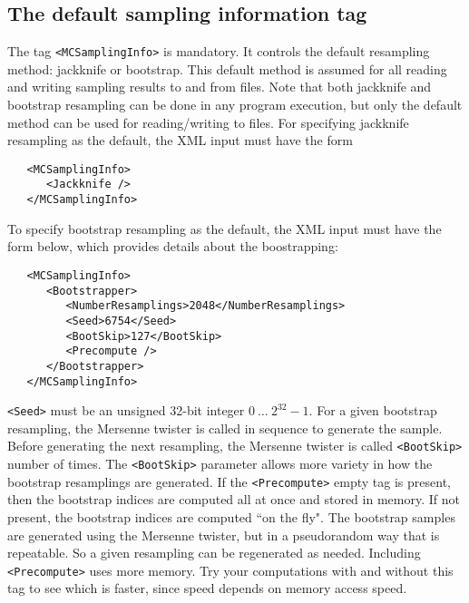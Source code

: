 \documentclass[12pt]{article}
\newcommand{\vb}{\texttt}
\begin{document}
\subsection{The default sampling information tag}
The tag \vb{<MCSamplingInfo>} is mandatory.  It controls the default
resampling method:  jackknife or bootstrap.  This default method    
is assumed for all reading and writing sampling results to and      
from files.  Note that both jackknife and bootstrap resampling      
can be done in any program execution, but only the default method can be used      
for reading/writing to files.  For specifying jackknife resampling as
the default, the XML input must have the form
\begin{verbatim}
   <MCSamplingInfo>
      <Jackknife />
   </MCSamplingInfo>
\end{verbatim}
To specify bootstrap resampling as the default, the XML input must have the
form below, which provides details about the boostrapping:
\begin{verbatim}
   <MCSamplingInfo> 
      <Bootstrapper>
         <NumberResamplings>2048</NumberResamplings>
         <Seed>6754</Seed> 
         <BootSkip>127</BootSkip>
         <Precompute /> 
      </Bootstrapper>
   </MCSamplingInfo> 
\end{verbatim}
\vb{<Seed>} must be an unsigned 32-bit integer $0\ \dots\ 2^{32}-1$.
For a given bootstrap resampling, the Mersenne twister is
called in sequence to generate the sample. Before generating
the next resampling, the Mersenne twister is called \vb{<BootSkip>}
number of times. The \vb{<BootSkip>} parameter allows more variety
in how the bootstrap resamplings are generated. If the \vb{<Precompute>} 
empty tag is present, then the bootstrap indices are computed all at once 
and stored in memory. If not present, the bootstrap indices are computed 
``on the fly". The bootstrap samples are generated using the Mersenne
twister, but in a pseudorandom way that is repeatable. So a given resampling 
can be regenerated as needed. Including \vb{<Precompute>} uses more memory.
Try your computations with and without this tag to see which is faster, 
since speed depends on memory access speed.
\end{document}
